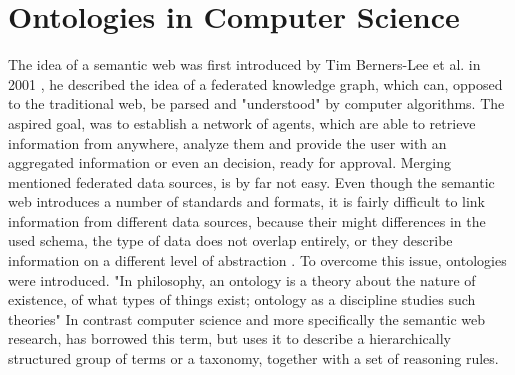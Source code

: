	\begin{comment}
	\begin{itemize}
		\item SVN and GIT are using unix-diff -> not suitable for XML files (cf. XML diff section)
		\item no semantic information about the changes (cf. comodi)
		\item no domain specific knowledge to improve mapping of different XML-tree branches
			\subitem important for good detection of tree branch movement etc. 
			\subitem "A model VCS should be tailored to existing model representation formats, which are typically XML and RDF based. It should furthermore reflect the temporal evolution of a model and present model changes to the users." \citep{Waltemath2013}
			\subitem "These
			common changes are detected by the LCS algorithm, but they are in fact irrelevant for the model’s history and would be neglected by entity-based algorithms. In other words, although being successfully used for source code version control, LCS is not suitable for XML version control (Chawathe et al., 1996)." \citep{Waltemath2013}
		\item As proposed in \citep{Waltemath2013} there are 2 major approaches to keep track of changes:
			\subitem keeping track of (minor) changes in the model itself
			\subitem tracking versions in the repository
	\end{itemize}
	\end{comment}

\section{Ontologies in Computer Science}
	The idea of a semantic web was first introduced by Tim Berners-Lee et al. in 2001 \citep{Berners-Lee2001}, he described the idea of a federated knowledge graph, which can, opposed to the traditional web, be parsed and "understood" by computer algorithms. The aspired goal, was to establish a network of agents, which are able to retrieve information from anywhere, analyze them and provide the user with an 
	aggregated information or even an decision, ready for approval.
	Merging mentioned federated data sources, is by far not easy. Even though the semantic web introduces a number of standards and formats, it is fairly difficult to link information from different data sources, because their might differences in the used schema, the type of data does not overlap entirely, or they describe information on a different level of abstraction \citep{Berners-Lee2001}.
	To overcome this issue, ontologies were introduced. "In philosophy, an ontology is a theory about the nature of existence, of what types of things exist; ontology as a discipline studies such theories" \citep{Berners-Lee2001}
	In contrast computer science and more specifically the semantic web research, has borrowed this term, but uses it to describe a hierarchically structured group of terms or a taxonomy, together with a set of reasoning rules.
	
